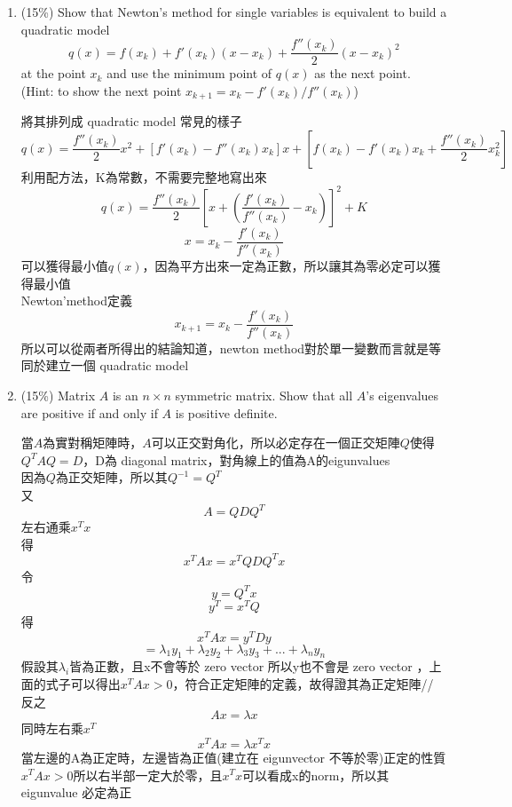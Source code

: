 \documentclass[a4paper,10pt]{article}
\begin{document}
\begin{enumerate}
{\color{blue}

\begin{CJK*}{UTF8}{bsmi}
因為binary search需要目標值與中間元素進行比較，才能進行一次收斂，但ternary search每次收斂都只需要1個點(以這題來說就是$x_4$)，這邊將ternary search每次也都帶入2個點

$$\frac{b}{a+b}= \frac{ \frac{b}{a}}{1+\frac{b}{a}}$$
將 $b/a=(\sqrt{5}+1)/2$帶入後可得$$\frac{b}{a+b}=(\sqrt{5}-1)/2$$因此可知每帶一次點可以收斂$\phi^{-1}$($\phi = \frac{b}{a}$)，所以收歛兩次等於對其做平方，故得$\phi^{-2}$
\end{CJK*}
}

\item (15\%) Show that Newton's method for single variables is equivalent to build a quadratic model 
$$q(x) = f(x_k) + f'(x_k)(x-x_k) + \frac{f''(x_k)}{2}(x-x_k)^2$$
at the point $x_k$ and use the minimum point of $q(x)$ as the next point.  (Hint: to show the next point $x_{k+1} = x_k -f'(x_k)/f''(x_k)$) 

{\color{blue}

\begin{CJK*}{UTF8}{bsmi}
將其排列成 quadratic model 常見的樣子
$$q(x) = \frac{f''(x_k)}{2}x^2+[f'(x_k)-f''(x_k)x_k]x+[f(x_k)-f'(x_k)x_k+\frac{f''(x_k)}{2}x_k^2]$$
利用配方法，K為常數，不需要完整地寫出來\\
$$q(x) = \frac{f''(x_k)}{2}[x+(\frac{f'(x_k)}{f''(x_k)} - x_k)]^2+ K $$
$$x = x_k - \frac{f'(x_k)}{f''(x_k)}$$
可以獲得最小值$q(x)$，因為平方出來一定為正數，所以讓其為零必定可以獲得最小值
\\

Newton'method定義
$$x_{k+1} = x_k - \frac{f'(x_k)}{f''(x_k)} $$
所以可以從兩者所得出的結論知道，newton method對於單一變數而言就是等同於建立一個 quadratic model
\end{CJK*}

}

\item (15\%) Matrix $A$ is an $n\times n$ symmetric matrix.  Show that  
all $A$'s eigenvalues are positive if and only if $A$ is positive definite. 

{\color{blue}

\begin{CJK*}{UTF8}{bsmi}
當$A$為實對稱矩陣時，$A$可以正交對角化，所以必定存在一個正交矩陣$Q$使得$Q^{T}AQ = D$，D為 diagonal matrix，對角線上的值為A的eigunvalues\\
因為$Q$為正交矩陣，所以其$Q^{-1} = Q^{T}$\\
又
$$A = QDQ^{T}$$
左右通乘$x^{T}x$\\
得
$$x^{T}Ax = x^{T}QDQ^{T}x$$
令
$$y = Q^{T}x$$
$$y^{T} = x^{T}Q$$
得
$$x^{T}Ax = y^{T}Dy$$
$$= \lambda_{1}y_1 + \lambda_{2}y_2 + \lambda_{3}y_3 + ... + \lambda_{n}y_n$$
假設其$\lambda_{i}$皆為正數，且x不會等於 zero vector 所以y也不會是 zero vector ，上面的式子可以得出$x^{T}Ax > 0$，符合正定矩陣的定義，故得證其為正定矩陣//
反之\\
$$Ax = \lambda x$$
同時左右乘$x^{T}$
$$x^{T}Ax = \lambda x^{T}x$$
當左邊的A為正定時，左邊皆為正值(建立在 eigunvector 不等於零)正定的性質$x^{T}Ax > 0$所以右半部一定大於零，且$x^{T}x$可以看成x的norm，所以其 eigunvalue 必定為正
\end{CJK*}

}
\end{enumerate}
\end{document}
